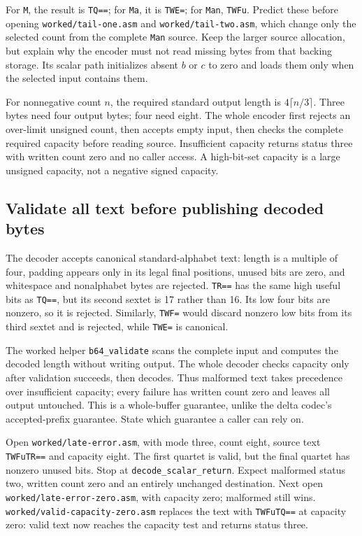 For \texttt{M}, the result is \texttt{TQ==}; for \texttt{Ma}, it is
\texttt{TWE=}; for \texttt{Man}, \texttt{TWFu}. Predict these before opening
\texttt{worked/tail-one.asm} and \texttt{worked/tail-two.asm}, which change only
the selected count from the complete \texttt{Man} source. Keep the larger source allocation, but
explain why the encoder must not read missing bytes from that backing storage.
Its scalar path initializes absent $b$ or $c$ to zero and loads them only when
the selected input contains them.

For nonnegative count $n$, the required standard output length is
$4\lceil n/3\rceil$. Three bytes need four output bytes; four need eight.
The whole encoder first rejects an over-limit unsigned count, then accepts
empty input, then checks the complete required capacity before reading source.
Insufficient capacity returns status three with written count zero and no
caller access. A high-bit-set capacity is a large unsigned capacity, not a
negative signed capacity.

\subsection*{Validate all text before publishing decoded bytes}

The decoder accepts canonical standard-alphabet text: length is a multiple of
four, padding appears only in its legal final positions, unused bits are zero,
and whitespace and nonalphabet bytes are rejected. \texttt{TR==} has the same
high useful bits as \texttt{TQ==}, but its second sextet is 17 rather than 16.
Its low four bits are nonzero, so it is rejected. Similarly, \texttt{TWF=}
would discard nonzero low bits from its third sextet and is rejected, while
\texttt{TWE=} is canonical.

The worked helper \texttt{b64\_validate} scans the complete input and computes
the decoded length without writing output. The whole decoder checks capacity
only after validation succeeds, then decodes. Thus malformed text takes precedence
over insufficient capacity; every failure has written count zero and leaves
all output untouched. This is a whole-buffer guarantee, unlike the delta
codec's accepted-prefix guarantee. State which guarantee a caller can rely on.

Open \texttt{worked/late-error.asm}, with mode three, count eight, source text
\texttt{TWFuTR==} and capacity eight. The first quartet is valid, but
the final quartet has nonzero unused bits. Stop at
\texttt{decode\_scalar\_return}. Expect malformed status two, written count
zero and an entirely unchanged destination. Next open \texttt{worked/late-error-zero.asm}, with capacity zero;
malformed still wins. \texttt{worked/valid-capacity-zero.asm} replaces the text
with \texttt{TWFuTQ==} at capacity zero: valid text now reaches the capacity
test and returns status three.

